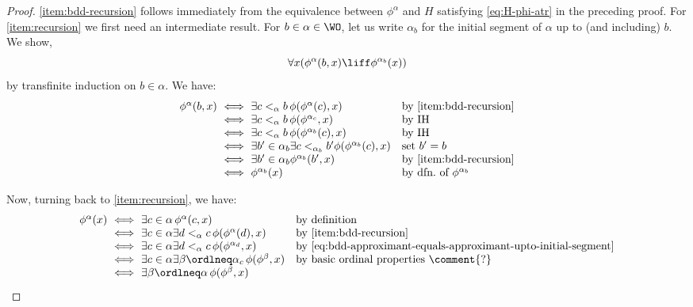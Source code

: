 \begin{proof}
    \ref{item:bdd-recursion} follows immediately from the equivalence between $\phi^\alpha$ and $H$ satisfying \eqref{eq:H-phi-atr} in the preceding proof. 
% 
    For \ref{item:recursion} we first need an intermediate result.
    For $b\in \alpha \in \WO$, let us write $\alpha_b$ for the initial segment of $\alpha$ up to (and including) $b$.
    We show,
    \begin{equation}
        \label{eq:bdd-approximant-equals-approximant-upto-initial-segment}
        \forall x (\phi^\alpha (b,x) \liff \phi^{\alpha_b}(x))
    \end{equation}
    by transfinite induction on $b\in \alpha$. 
    We have:
    \[
    \begin{array}{r@{\ \iff \ }ll}
         \phi^\alpha(b,x) & \exists c<_\alpha b\, \phi(\phi^\alpha(c),x) & \text{by \ref{item:bdd-recursion}}\\
         & \exists c<_\alpha b \, \phi (\phi^{\alpha_c},x) & \text{by IH} \\
         & \exists c<_\alpha b \, \phi (\phi^{\alpha_b}(c),x) & \text{by IH} \\
         & \exists b' \in \alpha_b \exists c <_{\alpha_b} b' \phi (\phi^{\alpha_b}(c),x) & \text{set $b'=b$} \\
         & \exists b' \in \alpha_b \phi^{\alpha_b}(b',x) & \text{by \ref{item:bdd-recursion}}\\
         & \phi^{\alpha_b}(x) &\text{by dfn.\ of $\phi^{\alpha_b}$}
    \end{array}
    \]

    Now, turning back to \ref{item:recursion}, we have:
    \[
    \begin{array}[b]{r@{\ \iff \ }ll}
         \phi^\alpha(x) & \exists c \in \alpha \, \phi^\alpha(c,x) & \text{by definition} \\
         & \exists c \in \alpha \exists d<_\alpha c\, \phi(\phi^\alpha(d),x) &\text{by \ref{item:bdd-recursion}} \\
         & \exists c \in \alpha \exists d<_\alpha c \, \phi(\phi^{\alpha_d},x) & \text{by \eqref{eq:bdd-approximant-equals-approximant-upto-initial-segment}} \\
         & \exists c \in \alpha \exists \beta \ordlneq \alpha_c \, \phi(\phi^\beta,x) & \text{by basic ordinal properties \comment{?}} \\
         & \exists \beta \ordlneq \alpha \, \phi(\phi^\beta,x) \tag*{\qed}
    \end{array}
    \]
    \renewcommand{\qed}{}
\end{proof}

